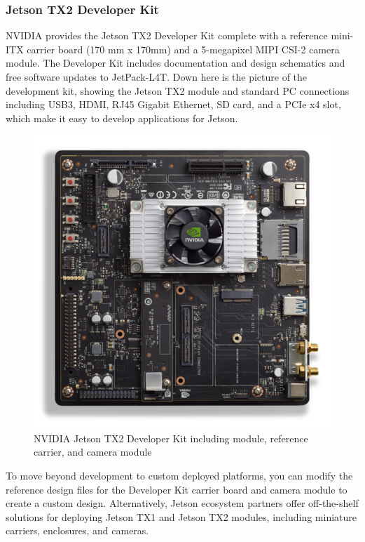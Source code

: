         \subsubsection{Jetson TX2 Developer Kit}
            NVIDIA provides the Jetson TX2 Developer Kit complete with a reference mini-ITX carrier board (170 mm x 170mm) and a 5-megapixel MIPI CSI-2 camera module. The Developer Kit includes documentation and design schematics and free software updates to JetPack-L4T. Down here is the picture of 
            the development kit, showing the Jetson TX2 module and standard PC connections including USB3, HDMI, RJ45 Gigabit Ethernet, SD card, and a PCIe x4 slot, which make it easy to develop applications for Jetson.
            \begin{figure}[H]
                \centering
                \includegraphics[width=0.6\linewidth]{img/tx2-dev-kit.png}
                \caption{NVIDIA Jetson TX2 Developer Kit including module, reference carrier, and camera module}
            \end{figure}
            To move beyond development to custom deployed platforms, you can modify the reference design files for the Developer Kit carrier board and camera module to create a custom design. Alternatively, Jetson ecosystem partners offer off-the-shelf solutions for deploying Jetson TX1 and 
            Jetson TX2 modules, including miniature carriers, enclosures, and cameras.
